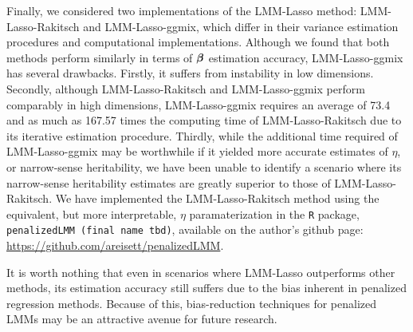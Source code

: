 Finally, we considered two implementations of the LMM-Lasso method: LMM-Lasso-Rakitsch and LMM-Lasso-ggmix, which differ in their variance estimation procedures and computational implementations. Although we found that both methods perform similarly in terms of $\boldsymbol{\beta}$ estimation accuracy, LMM-Lasso-ggmix has several drawbacks. Firstly, it suffers from instability in low dimensions. Secondly, although LMM-Lasso-Rakitsch and LMM-Lasso-ggmix perform comparably in high dimensions, LMM-Lasso-ggmix requires an average of 73.4 and as much as 167.57  times the computing time of LMM-Lasso-Rakitsch due to its iterative estimation procedure. Thirdly, while the additional time required of LMM-Lasso-ggmix may be worthwhile if it yielded more accurate estimates of $\eta$, or narrow-sense heritability, we have been unable to identify a scenario where its narrow-sense heritability estimates are greatly superior to those of LMM-Lasso-Rakitsch. We have implemented the LMM-Lasso-Rakitsch method using the equivalent, but more interpretable, $\eta$ paramaterization in the \texttt{R} package, \texttt{penalizedLMM (final name tbd)}, available on the author's github page: \url{https://github.com/areisett/penalizedLMM}.


It is worth nothing that even in scenarios where LMM-Lasso outperforms other methods, its estimation accuracy still suffers due to the bias inherent in penalized regression methods. Because of this, bias-reduction techniques for penalized LMMs may be an attractive avenue for future research.

